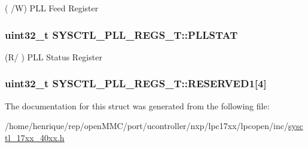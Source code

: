 ( /\-W) P\-L\-L Feed Register \hypertarget{structSYSCTL__PLL__REGS__T_a9cc1486fbc5a9888ccdd70df2b57ebec}{
\subsubsection[{P\-L\-L\-S\-T\-A\-T}]{ uint32\-\_\-t S\-Y\-S\-C\-T\-L\-\_\-\-P\-L\-L\-\_\-\-R\-E\-G\-S\-\_\-\-T\-::\-P\-L\-L\-S\-T\-A\-T}}\label{structSYSCTL__PLL__REGS__T_a9cc1486fbc5a9888ccdd70df2b57ebec}
(R/ ) P\-L\-L Status Register \hypertarget{structSYSCTL__PLL__REGS__T_a8f564110c46a5fba4e6d306cd4137bd3}{
\subsubsection[{R\-E\-S\-E\-R\-V\-E\-D1}]{\setlength{\rightskip}{0pt plus 5cm}uint32\-\_\-t S\-Y\-S\-C\-T\-L\-\_\-\-P\-L\-L\-\_\-\-R\-E\-G\-S\-\_\-\-T\-::\-R\-E\-S\-E\-R\-V\-E\-D1\mbox{[}4\mbox{]}}}\label{structSYSCTL__PLL__REGS__T_a8f564110c46a5fba4e6d306cd4137bd3}


The documentation for this struct was generated from the following file\-:\begin{DoxyCompactItemize}
\item 
/home/henrique/rep/open\-M\-M\-C/port/ucontroller/nxp/lpc17xx/lpcopen/inc/\hyperlink{sysctl__17xx__40xx_8h}{sysctl\-\_\-17xx\-\_\-40xx.\-h}\end{DoxyCompactItemize}
